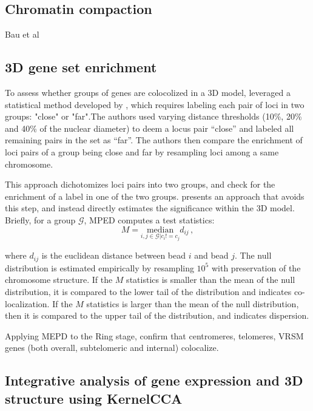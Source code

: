 \documentclass[letterpaper,12pt]{article}
\begin{document}
\subsection{Chromatin compaction}

Bau et al


\subsection*{3D gene set enrichment}

To assess whether groups of genes are colocolized in a 3D model,
\citet{ay:three-dimensional} leveraged a statistical method developed by
\citet{witten:assessment}, which requires labeling each pair of loci in two
groups: "close" or "far".The authors used varying distance thresholds (10\%,
20\% and 40\% of the nuclear diameter) to deem a locus pair “close” and
labeled all remaining pairs in the set as “far”.  The authors then compare the
enrichment of loci pairs of a group being close and far by resampling loci
among a same chromosome.

This approach dichotomizes loci pairs into two groups, and check for the
enrichment of a label in one of the two groups. \citep{capurso:distance-based}
presents an approach that avoids this step, and instead directly estimates the
significance within the 3D model. Briefly, for a group $\mathcal{G}$, MPED
computes a test statistics:
\begin{equation*}
M = \underset{i,j \in \mathcal{G}| c_i != c_j}{\text{median}} d_{ij}\,,
\end{equation*}

where $d_{ij}$ is the euclidean distance between bead $i$ and bead $j$. The
null distribution is estimated empirically by resampling $10^5$ with
preservation of the chromosome structure. If the $M$ statistics is smaller
than the mean of the null distribution, it is compared to the lower tail of
the distribution and indicates co-localization. If the $M$ statistics is
larger than the mean of the null distribution, then it is compared to the
upper tail of the distribution, and indicates dispersion.

Applying MEPD to the Ring stage, \citet{capurso:distance-based} confirm that
centromeres, telomeres, VRSM genes (both overall, subtelomeric and internal)
colocalize.


\subsection*{Integrative analysis of gene expression and 3D structure using KernelCCA}
\end{document}
